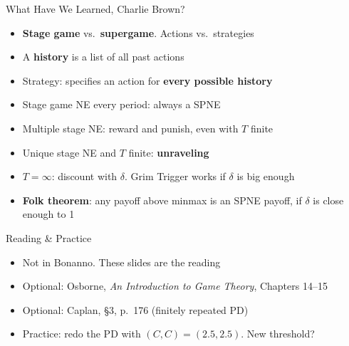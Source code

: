 \begin{frame}{What Have We Learned, Charlie Brown?}
\begin{itemize}
    \item \textbf{Stage game} vs.\ \textbf{supergame}. Actions vs.\ strategies
    \item A \textbf{history} is a list of all past actions
    \item Strategy: specifies an action for \textbf{every possible history}
    \item Stage game NE every period: always a SPNE
    \item Multiple stage NE: reward and punish, even with $T$ finite
    \item Unique stage NE and $T$ finite: \textbf{unraveling}
    \item $T=\infty$: discount with $\delta$. Grim Trigger works if $\delta$ is big enough
    \item \textbf{Folk theorem}: any payoff above minmax is an SPNE payoff, if $\delta$ is close enough to 1
\end{itemize}
\vfill
\vspace{-0.4in}
\end{frame}

\begin{frame}{Reading \& Practice}
\begin{itemize}
    \item Not in Bonanno. These slides are the reading
    \item Optional: Osborne, \textit{An Introduction to Game Theory}, Chapters 14--15
    \item Optional: Caplan, \S3, p.~176 (finitely repeated PD)
    \item Practice: redo the PD with $(C,C)=(2.5,2.5)$. New threshold?
\end{itemize}
\vfill
\end{frame}


